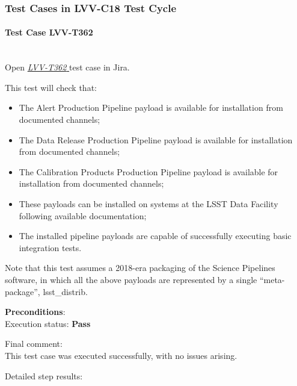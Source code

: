 \documentclass[DM,STR,toc]{lsstdoc}
\providecommand{\tightlist}{
  \setlength{\itemsep}{0pt}\setlength{\parskip}{0pt}}
\begin{document}
  \subsubsection{Test Cases in LVV-C18 Test Cycle}


    \paragraph{Test Case LVV-T362 }\mbox{}\\

Open  \href{https://jira.lsstcorp.org/secure/Tests.jspa#/testCase/LVV-T362}{\textit{ LVV-T362 } }
test case in Jira.

    This test will check that:

\begin{itemize}
\tightlist
\item
  The Alert Production Pipeline payload is available for installation
  from documented channels;
\item
  The Data Release Production Pipeline payload is available for
  installation from documented channels;
\item
  The Calibration Products Production Pipeline payload is available for
  installation from documented channels;
\item
  These payloads can be installed on systems at the LSST Data Facility
  following available documentation;
\item
  The installed pipeline payloads are capable of successfully executing
  basic integration tests.
\end{itemize}

Note that this test assumes a 2018-era packaging of the Science
Pipelines software, in which all the above payloads are represented by a
single ``meta-package'', lsst\_distrib.


    {\bf Preconditions}:\\
    

    Execution status: {\bf Pass }

    Final comment:\\This test case was executed successfully, with no issues arising.



    Detailed step results:
\end{document}
